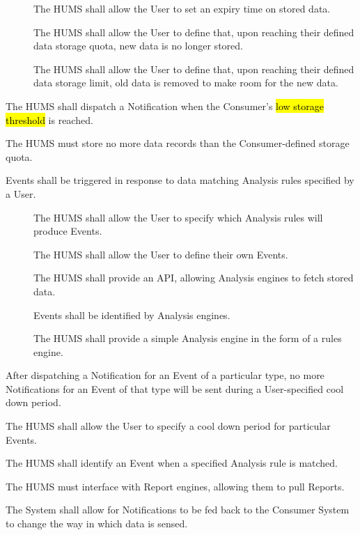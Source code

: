 \begin{description}
\begin{description}
		  \item[] The HUMS shall allow the User to set an 
			expiry time on stored data.
		  \item[] The HUMS shall allow the User to define that, 
			upon reaching their defined data storage quota, new data is 
			no longer stored.
		 \item[] The HUMS shall allow the User to define that, 
			upon reaching their defined data storage limit, old data is 
			removed to make room for the new data.
	\end{description}
	 \item[\fr{5}] The HUMS shall dispatch a Notification when the Consumer's 
		\hl{low storage threshold} is reached.
	  \item[\fr{6}] The HUMS must store no more data records than the 	
		Consumer-defined storage quota.
	\item[\fr{7}] Events shall be triggered in response to data matching Analysis 
	rules specified by a User.
		  \begin{description}
			 \item[]  The HUMS shall allow the User to specify 	
			which Analysis rules will produce Events.
			 \item[] The HUMS shall allow the User to define their
 			own Events.
 			\item[] The HUMS shall provide an API, 			
			allowing Analysis engines to fetch stored data.
			\item[] Events shall be identified by Analysis engines.
 			\item[] The HUMS shall provide a simple Analysis 	
			engine in the form of a rules engine.
	\end{description}
	
	\item[\fr{8}] After dispatching a Notification for an Event of a particular 
		type, no more Notifications for an Event of that type will be 	
		sent during a User-specified cool down period.
			\item[\fr{8.1}] The HUMS shall allow the User to specify a cool down
				period for particular Events.
	\item[\fr{9}] The HUMS shall identify an Event when a specified Analysis 
		rule is matched.
	\item[\fr{10}] The HUMS must interface with Report engines, allowing 
		them to pull Reports.
	\item[\fr{11}] The System shall allow for Notifications to be fed back to the
		Consumer System to change the way in which data is sensed.
\end{description}

